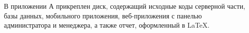 

В приложении А
прикреплен диск, содержащий исходные коды серверной части, базы данных,
мобильного приложения, веб-приложения с панелью администратора и менеджера,
а также отчет, оформленный в LaTeX.

\newpage
